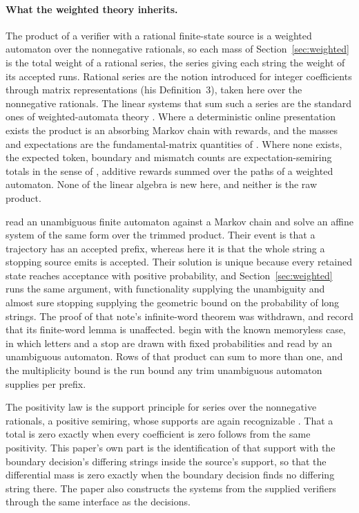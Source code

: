\documentclass[11pt,a4paper]{article}
\theoremstyle{definition}
\theoremstyle{plain}
\begin{document}
\paragraph{What the weighted theory inherits.} The product of a verifier with a rational finite-state source is a
weighted automaton over the nonnegative rationals, so each mass of Section~\ref{sec:weighted} is the total weight of a
rational series, the series giving each string the weight of its accepted runs. Rational series are the notion
\citet{schutzenberger1961definition} introduced for integer coefficients through matrix representations (his
Definition~3), taken here over the nonnegative rationals. The linear systems that sum such a series are the standard
ones of weighted-automata theory \citep{droste2009handbook}. Where a deterministic online presentation exists the
product is an absorbing Markov chain with rewards, and the masses and expectations are the fundamental-matrix quantities
of \citet[Theorems~3.2.4, 3.3.5 and~3.3.7]{kemeny1960finite}. Where none exists, the expected token, boundary and
mismatch counts are expectation-semiring totals in the sense of \citet[Section~4]{eisner2002parameter}, additive rewards
summed over the paths of a weighted automaton. None of the linear algebra is new here, and neither is the raw product.

\citet{benedikt2014unambiguous} read an unambiguous finite automaton against a Markov chain and solve an affine system
of the same form over the trimmed product. Their event is that a trajectory has an accepted prefix, whereas here it is
that the whole string a stopping source emits is accepted. Their solution is unique because every retained state reaches
acceptance with positive probability, and Section~\ref{sec:weighted} runs the same argument, with functionality
supplying the unambiguity and almost sure stopping supplying the geometric bound on the probability of long strings. The
proof of that note's infinite-word theorem was withdrawn, and \citet{baier2023unambiguous} record that its finite-word
lemma is unaffected. \citet{kiefer2019unambiguous} begin with the known memoryless case, in which letters and a stop are
drawn with fixed probabilities and read by an unambiguous automaton. Rows of that product can sum to more than one, and
the multiplicity bound is the run bound any trim unambiguous automaton supplies per prefix.

The positivity law is the support principle for series over the nonnegative rationals, a positive semiring, whose
supports are again recognizable \citep[Theorem~3.1(1)]{kirsten2011support}. That a total is zero exactly when every
coefficient is zero follows from the same positivity. This paper's own part is the identification of that support with
the boundary decision's differing strings inside the source's support, so that the differential mass is zero exactly
when the boundary decision finds no differing string there. The paper also constructs the systems from the supplied
verifiers through the same interface as the decisions.
\end{document}
